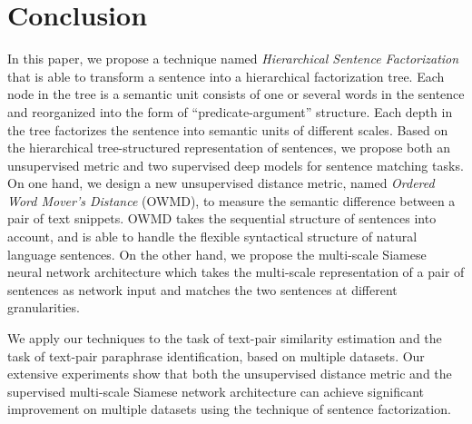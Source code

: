 \section{Conclusion}
\label{sec:conclude}

In this paper, we propose a technique named \textit{Hierarchical Sentence Factorization} that is able to transform a sentence into a hierarchical factorization tree. Each node in the tree is a semantic unit consists of one or several words in the sentence and reorganized into the form of ``predicate-argument'' structure. Each depth in the tree factorizes the sentence into semantic units of different scales.
Based on the hierarchical tree-structured representation of sentences, we propose both an unsupervised metric and two supervised deep models for sentence matching tasks. On one hand, we design a new unsupervised distance metric, named \textit{Ordered Word Mover's Distance} (OWMD), to measure the semantic difference between a pair of text snippets.
OWMD takes the sequential structure of sentences into account, and is able to handle the flexible syntactical structure of natural language sentences.
On the other hand, we propose the multi-scale Siamese neural network architecture which takes the multi-scale representation of a pair of sentences as network input and matches the two sentences at different granularities.

We apply our techniques to the task of text-pair similarity estimation and the task of text-pair paraphrase identification, based on multiple datasets. Our extensive experiments show that both the unsupervised distance metric and the supervised multi-scale Siamese network architecture can achieve significant improvement on multiple datasets using the technique of sentence factorization. 

